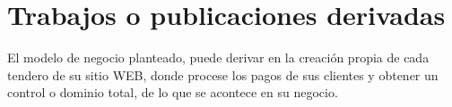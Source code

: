 \section{Trabajos o publicaciones derivadas}
	{El modelo de negocio planteado, puede derivar en la creación propia de cada tendero de su sitio WEB, donde procese los pagos de sus clientes y obtener un control o dominio total, de lo que se acontece en su negocio.}